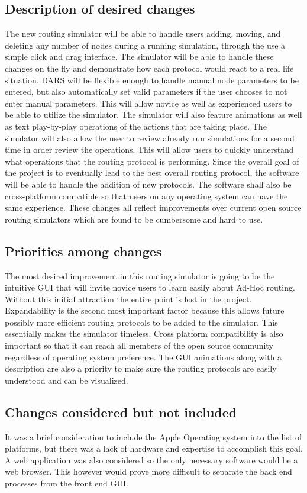 \documentclass[a4paper,11pt,titlepage]{article}
\begin{document}
\subsection{Description of desired changes}
The new routing simulator will be able to handle users adding, moving, and deleting any number of nodes during a running simulation, through the use a simple click and drag interface.  The simulator will be able to handle these changes on the fly and demonstrate how each protocol would react to a real life situation. DARS will be flexible enough to handle manual node parameters to be entered, but also automatically set valid parameters if the user chooses to not enter manual parameters. This will allow novice as well as experienced users to be able to utilize the simulator.  The simulator will also feature animations as well as text play-by-play operations of the actions that are taking place. The simulator will also allow the user to review already run simulations for a second time in order review the operations.  This will allow users to quickly understand what operations that the routing protocol is performing.  Since the overall goal of the project is to eventually lead to the best overall routing protocol, the software will be able to handle the addition of new protocols.  The software shall also be cross-platform compatible so that users on any operating system can have the same experience.  These changes all reflect improvements over current open source routing simulators which are found to be cumbersome and hard to use.
 
\subsection{Priorities among changes}
The most desired improvement in this routing simulator is going to be the intuitive GUI that will invite novice users to learn easily about Ad-Hoc routing.  Without this initial attraction the entire point is lost in the project.  Expandability is the second most important factor because this allows future possibly more efficient routing protocols to be added to the simulator. This essentially makes the simulator timeless. Cross platform compatibility is also important so that it can reach all members of the open source community regardless of operating system preference. The GUI animations along with a description are also a priority to make sure the routing protocols are easily understood and can be visualized.
 
\subsection{Changes considered but not included}
It was a brief consideration to include the Apple Operating system into the list of platforms, but there was a lack of hardware and expertise to accomplish this goal.  A web application was also considered so the only necessary software would be a web browser.  This however would prove more difficult to separate the back end processes from the front end GUI.
 
\end{document}
